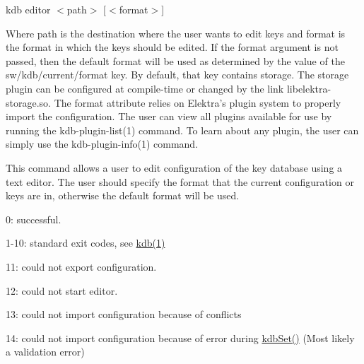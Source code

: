 {\ttfamily kdb editor $<$path$>$ \mbox{[}$<$format$>$\mbox{]}}

Where {\ttfamily path} is the destination where the user wants to edit keys and {\ttfamily format} is the format in which the keys should be edited. If the {\ttfamily format} argument is not passed, then the default format will be used as determined by the value of the {\ttfamily sw/kdb/current/format} key. By default, that key contains {\ttfamily storage}. The {\ttfamily storage} plugin can be configured at compile-\/time or changed by the link {\ttfamily libelektra-\/storage.\+so}. The {\ttfamily format} attribute relies on Elektra’s plugin system to properly import the configuration. The user can view all plugins available for use by running the kdb-\/plugin-\/list(1) command. To learn about any plugin, the user can simply use the kdb-\/plugin-\/info(1) command.

This command allows a user to edit configuration of the key database using a text editor. The user should specify the format that the current configuration or keys are in, otherwise the default format will be used.


\begin{DoxyItemize}
\item 0\+: successful.
\item 1-\/10\+: standard exit codes, see \mbox{\hyperlink{doc_help_kdb_md}{kdb(1)}}
\item 11\+: could not export configuration.
\item 12\+: could not start editor.
\item 13\+: could not import configuration because of conflicts
\item 14\+: could not import configuration because of error during \mbox{\hyperlink{group__kdb_ga11436b058408f83d303ca5e996832bcf}{kdb\+Set()}} (Most likely a validation error)
\end{DoxyItemize}


